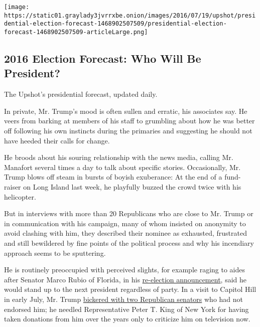 \href{https://www.nytimes3xbfgragh.onion/interactive/2016/upshot/presidential-polls-forecast.html}{}

\texttt{[image: https://static01.graylady3jvrrxbe.onion/images/2016/07/19/upshot/presidential-election-forecast-1468902507509/presidential-election-forecast-1468902507509-articleLarge.png]}

\hypertarget{2016-election-forecast-who-will-be-president}{%
\subsection{2016 Election Forecast: Who Will Be
President?}\label{2016-election-forecast-who-will-be-president}}

The Upshot's presidential forecast, updated daily.

In private, Mr. Trump's mood is often sullen and erratic, his associates
say. He veers from barking at members of his staff to grumbling about
how he was better off following his own instincts during the primaries
and suggesting he should not have heeded their calls for change.

He broods about his souring relationship with the news media, calling
Mr. Manafort several times a day to talk about specific stories.
Occasionally, Mr. Trump blows off steam in bursts of boyish exuberance:
At the end of a fund-raiser on Long Island last week, he playfully
buzzed the crowd twice with his helicopter.

But in interviews with more than 20 Republicans who are close to Mr.
Trump or in communication with his campaign, many of whom insisted on
anonymity to avoid clashing with him, they described their nominee as
exhausted, frustrated and still bewildered by fine points of the
political process and why his incendiary approach seems to be
sputtering.

He is routinely preoccupied with perceived slights, for example raging
to aides after Senator Marco Rubio of Florida, in his
\href{http://www.nytimes3xbfgragh.onion/2016/06/23/us/politics/marco\%2Drubio\%2Dflorida\%2Dsenate\%2Drace.html}{re-election
announcement}, said he would stand up to the next president regardless
of party. In a visit to Capitol Hill in early July, Mr. Trump
\href{http://www.nytimes3xbfgragh.onion/2016/07/08/us/politics/donald-trump-republican-party.html}{bickered
with two Republican senators} who had not endorsed him; he needled
Representative Peter T. King of New York for having taken donations from
him over the years only to criticize him on television now.

